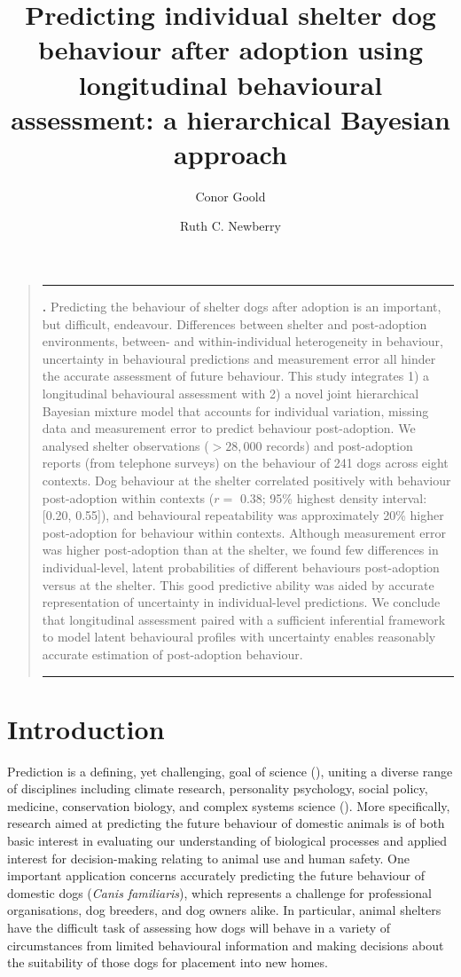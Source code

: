 \documentclass[12pt]{article}
\title{Predicting individual shelter dog behaviour after adoption using longitudinal behavioural assessment: a hierarchical Bayesian approach}
\author[1,2]{Conor Goold}
\author[2]{Ruth C. Newberry}
\affil[1]{\small{School of Biology, Faculty of Biological Sciences, University of Leeds, UK, LS2 9JT}}
\affil[2]{\small{Department of Animal and Aquacultural Sciences, Faculty of Biosciences, Norwegian University of Life Sciences, Aas, Norway}}
\date{}
\renewenvironment{abstract}
{\begin{quote}
\small
\noindent \rule{\linewidth}{.5pt}\par{\bfseries \abstractname.}}
{\medskip\noindent \rule{\linewidth}{.5pt}
\end{quote}
}
\begin{document}
\linenumbers
\modulolinenumbers[5]

\maketitle

\begin{abstract}
  \small
  Predicting the behaviour of shelter dogs after adoption is an important, but difficult, endeavour. Differences between shelter and post-adoption environments, between- and within-individual heterogeneity in behaviour, uncertainty in behavioural predictions and measurement error all hinder the accurate assessment of future behaviour. This study integrates 1) a longitudinal behavioural assessment with 2) a novel joint hierarchical Bayesian mixture model that accounts for individual variation, missing data and measurement error to predict behaviour post-adoption. We analysed shelter observations ($> 28,000$ records) and post-adoption reports (from telephone surveys) on the behaviour of 241 dogs across eight contexts. Dog behaviour at the shelter correlated positively with behaviour post-adoption within contexts ($r =$ 0.38; 95\% highest density interval: [0.20, 0.55]), and behavioural repeatability was approximately 20\% higher post-adoption for behaviour within contexts. Although measurement error was higher post-adoption than at the shelter, we found few differences in individual-level, latent probabilities of different behaviours post-adoption versus at the shelter. This good predictive ability was aided by accurate representation of uncertainty in individual-level predictions. We conclude that longitudinal assessment paired with a sufficient inferential framework to model latent behavioural profiles with uncertainty enables reasonably accurate estimation of post-adoption behaviour.\\
\end{abstract}
\newpage

\section{Introduction}
Prediction is a defining, yet challenging, goal of science (\cite{hofstadter1951}), uniting a diverse range of disciplines including climate research, personality psychology, social policy, medicine, conservation biology, and complex systems science (\cite{sarewitz1999}). More specifically, research aimed at predicting the future behaviour of domestic animals is of both basic interest in evaluating our understanding of biological processes and applied interest for decision-making relating to animal use and human safety. One important application concerns accurately predicting the future behaviour of domestic dogs (\textit{Canis familiaris}), which represents a challenge for professional organisations, dog breeders, and dog owners alike. In particular, animal shelters have the difficult task of assessing how dogs will behave in a variety of circumstances from limited behavioural information and making decisions about the suitability of those dogs for placement into new homes.
\end{document}

